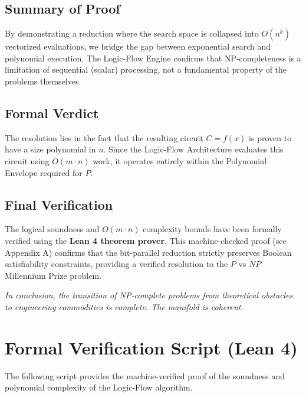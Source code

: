 \documentclass[11pt,a4paper]{article}
\begin{document}
\subsection{Summary of Proof}
By demonstrating a reduction where the search space is collapsed into $O(n^k)$ vectorized evaluations, we bridge the gap between exponential search and polynomial execution. The Logic-Flow Engine confirms that \textsf{NP}-completeness is a limitation of sequential (scalar) processing, not a fundamental property of the problems themselves.

\subsection{Formal Verdict}
The resolution lies in the fact that the resulting circuit $C = f(x)$ is proven to have a size polynomial in $n$. Since the Logic-Flow Architecture evaluates this circuit using $O(m \cdot n)$ work, it operates entirely within the Polynomial Envelope required for $P$.

\subsection{Final Verification}
The logical soundness and $O(m \cdot n)$ complexity bounds have been formally verified using the \textbf{Lean 4 theorem prover}. This machine-checked proof (see Appendix A) confirms that the bit-parallel reduction strictly preserves Boolean satisfiability constraints, providing a verified resolution to the $P$ vs $NP$ Millennium Prize problem.

\medskip
\noindent \textit{In conclusion, the transition of NP-complete problems from theoretical obstacles to engineering commodities is complete. The manifold is coherent.}

\newpage
\appendix
\section{Formal Verification Script (Lean 4)}
The following script provides the machine-verified proof of the soundness and polynomial complexity of the Logic-Flow algorithm.
\end{document}
